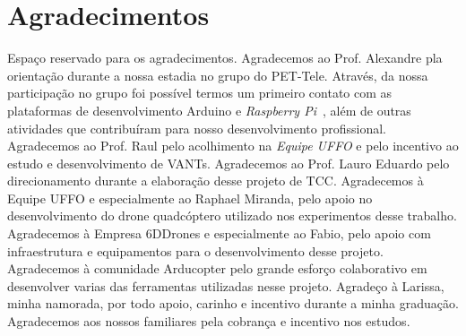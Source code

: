 \documentclass[12pt,a4paper,oneside]{book}
\begin{document}
\chapter*{Agradecimentos}

\thispagestyle{myheadings}
%
Espaço reservado para os agradecimentos.
%
Agradecemos ao Prof. Alexandre pla orientação durante a nossa estadia no grupo do PET-Tele. Através, 
da nossa participação no grupo foi possível termos um primeiro contato com as plataformas de desenvolvimento 
Arduino e \textit{Raspberry Pi}~\cite{url:raspberrypi}, além de outras atividades que contribuíram para nosso
desenvolvimento profissional.
%
Agradecemos ao Prof. Raul pelo acolhimento na \textit{Equipe UFFO} e pelo incentivo ao estudo e desenvolvimento 
de VANTs. 
%
Agradecemos ao Prof. Lauro Eduardo pelo direcionamento durante a elaboração desse projeto de TCC. 
%
Agradecemos à Equipe UFFO e especialmente ao Raphael Miranda, pelo apoio no desenvolvimento do drone quadcóptero 
utilizado nos experimentos desse trabalho. 
%
Agradecemos à Empresa 6DDrones e especialmente ao Fabio, pelo apoio com infraestrutura e equipamentos para o desenvolvimento 
desse projeto.
%
Agradecemos à comunidade Arducopter pelo grande esforço colaborativo em desenvolver varias das ferramentas utilizadas nesse projeto.
%
Agradeço à Larissa, minha namorada, por todo apoio, carinho e incentivo durante a minha graduação.
%
Agradecemos aos nossos familiares pela cobrança e incentivo nos estudos.
%


%
\listoffigures
%
%
\thispagestyle{myheadings}
%


%
\listoftables
%
%
\thispagestyle{myheadings}
%


%
\tableofcontents
%
\thispagestyle{myheadings}
\end{document}
